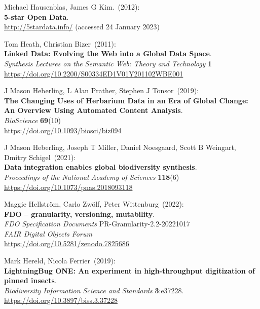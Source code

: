 \begin{thebibliography}{9}
Michael Hausenblas, James G Kim.~(2012): \\
\textbf{5-star {Open Data}}. \\
\url{http://5stardata.info/} (accessed 24 January 2023)

Tom Heath, Christian Bizer~(2011): \\
\textbf{Linked Data: Evolving the Web into a Global Data Space}.\\
\emph{Synthesis Lectures on the Semantic Web: Theory and Technology} \textbf{1}\\
\url{https://doi.org/10.2200/S00334ED1V01Y201102WBE001}

J Mason Heberling, L Alan Prather, Stephen J Tonsor~(2019): \\
\textbf{The Changing Uses of Herbarium Data in an Era of Global Change: An Overview
Using Automated Content Analysis}.\\
\emph{BioScience} \textbf{69}(10)\\
\url{https://doi.org/10.1093/biosci/biz094}

J Mason Heberling, Joseph T Miller, Daniel Noesgaard, Scott B Weingart, Dmitry Schigel~(2021): \\
\textbf{Data integration enables global biodiversity
synthesis}.\\
\emph{Proceedings of the National Academy of Sciences} \textbf{118}(6)\\
\url{https://doi.org/10.1073/pnas.2018093118}

Maggie Hellström, Carlo Zwölf, Peter Wittenburg~(2022): \\
\textbf{FDO -- granularity, versioning, mutability}. \\
\emph{FDO Specification Documents} PR-Granularity-2.2-20221017\\
\emph{FAIR Digital Objects Forum}\\
\url{https://doi.org/10.5281/zenodo.7825686}

Mark Hereld, Nicola Ferrier~(2019): \\
\textbf{LightningBug ONE: An experiment in high-throughput digitization of pinned insects}.\\
\emph{Biodiversity Information Science and Standards} \textbf{3}:e37228.\\
\url{https://doi.org/10.3897/biss.3.37228}


\end{thebibliography}
